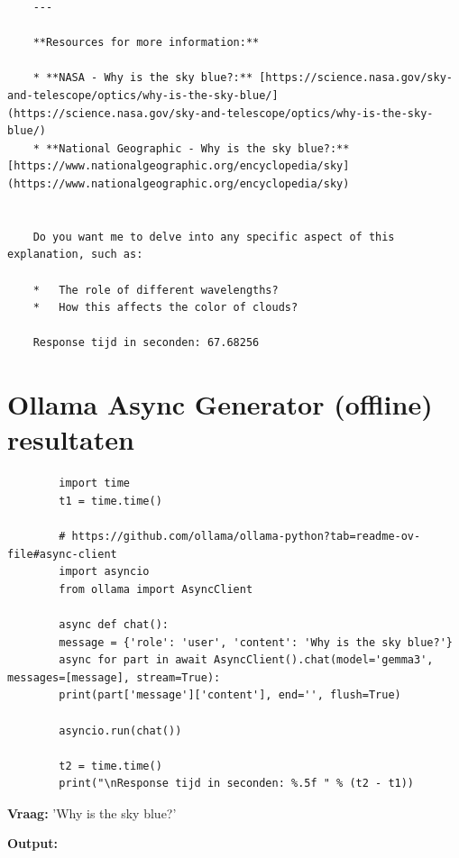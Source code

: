 \begin{verbatim}
    ---
    
    **Resources for more information:**
    
    * **NASA - Why is the sky blue?:** [https://science.nasa.gov/sky-and-telescope/optics/why-is-the-sky-blue/](https://science.nasa.gov/sky-and-telescope/optics/why-is-the-sky-blue/)  
    * **National Geographic - Why is the sky blue?:** [https://www.nationalgeographic.org/encyclopedia/sky](https://www.nationalgeographic.org/encyclopedia/sky)
    
    
    Do you want me to delve into any specific aspect of this explanation, such as:
    
    *   The role of different wavelengths?
    *   How this affects the color of clouds?
    
    Response tijd in seconden: 67.68256
\end{verbatim}

\section{Ollama Async Generator (offline) resultaten}
\label{sec:ollamaasyncgeneratorofflineresultaten}

\begin{listing}
    \begin{verbatim}
        import time
        t1 = time.time()
        
        # https://github.com/ollama/ollama-python?tab=readme-ov-file#async-client
        import asyncio
        from ollama import AsyncClient
        
        async def chat():
        message = {'role': 'user', 'content': 'Why is the sky blue?'}
        async for part in await AsyncClient().chat(model='gemma3', messages=[message], stream=True):
        print(part['message']['content'], end='', flush=True)
        
        asyncio.run(chat())
        
        t2 = time.time()
        print("\nResponse tijd in seconden: %.5f " % (t2 - t1))
    \end{verbatim}
    \caption[Ollama Async Generator Code]{Code om te communiceren met \textit{gemma3:4b}.}
    \label{lst:ollama-async-generator-test}
\end{listing}

\textbf{Vraag:} 'Why is the sky blue?'

\textbf{Output:}

